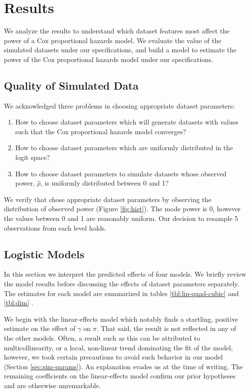\section{Results}

We analyze the results to understand which dataset features most affect the power of a Cox proportional hazards model. We evaluate the value of the simulated datasets under our specifications, and build a model to estimate the power of the Cox proportional hazards model under our specifications. 

\subsection{Quality of Simulated Data}

We acknowledged three problems in choosing appropriate dataset parameters:

\begin{enumerate}
    \item How to choose dataset parameters which will generate datasets with values such that the Cox proportional hazards model converges?
    \item How to choose dataset parameters which are uniformly distributed in the logit space? 
    \item How to choose dataset parameters to simulate datasets whose observed power, $\hat \rho$, is uniformly distributed between 0 and 1?
\end{enumerate}



We verify that chose appropriate dataset parameters by observing the distribution of observed power (Figure \ref{fig:hist}). The mode power is 0, however the values between 0 and 1 are reasonably uniform. Our decision to resample 5 observations from each level holds. 

\subsection{Logistic Models}

In this section we interpret the predicted effects of four models. We briefly review the model results before discussing the effects of dataset parameters separately. The estimates for each model are summarized in tables \ref{tbl:lin-quad-cubic} and \ref{tbl:dim}  \cite{stargazer}. 

We begin with the linear-effects model which notably finds a startling, positive estimate on the effect of $\gamma$ on $\pi$. That said, the result is not reflected in any of the other models. Often, a result such as this can be attributed to multicollinearity, or a local, non-linear trend dominating the fit of the model, however, we took certain precautions to avoid such behavior in our model (Section \ref{sec:sim-params}).  An explanation evades us at the time of writing. The remaining coefficients on the linear-effects model confirm our prior hypotheses and are otherwise unremarkable.

